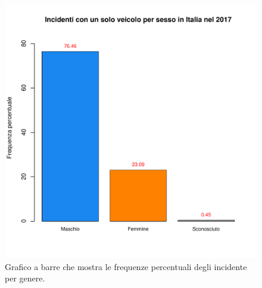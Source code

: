 \documentclass[12pt,a4paper,final,oneside]{article}			%
\begin{document}
         \begin{figure}[h!]
            \centering
            \includegraphics[scale=0.5]{../results/incidenti_per_sesso.pdf}
            \caption{Grafico a barre che mostra le frequenze percentuali degli incidente per genere.}
            \label{Fig: sesso_incidenti}
        \end{figure}
        
\end{document}
